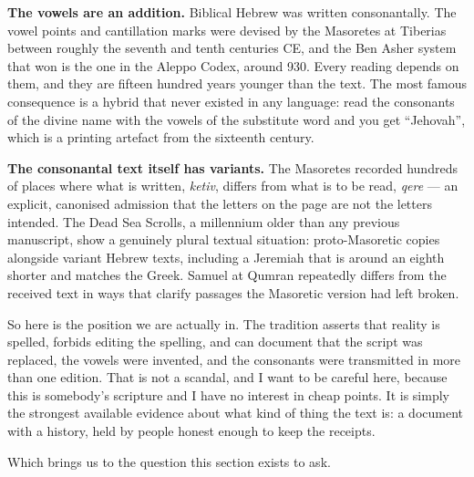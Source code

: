\textbf{The vowels are an addition.} Biblical Hebrew was written consonantally. The vowel points
and cantillation marks were devised by the Masoretes at Tiberias between roughly the seventh and
tenth centuries CE, and the Ben Asher system that won is the one in the Aleppo Codex, around 930.
Every reading depends on them, and they are fifteen hundred years younger than the text. The most
famous consequence is a hybrid that never existed in any language: read the consonants of the
divine name with the vowels of the substitute word and you get ``Jehovah'', which is a printing
artefact from the sixteenth century.

\textbf{The consonantal text itself has variants.} The Masoretes recorded hundreds of places where
what is written, \emph{ketiv}, differs from what is to be read, \emph{qere} --- an explicit,
canonised admission that the letters on the page are not the letters intended. The Dead Sea
Scrolls, a millennium older than any previous manuscript, show a genuinely plural textual
situation: proto-Masoretic copies alongside variant Hebrew texts, including a Jeremiah that is
around an eighth shorter and matches the Greek. Samuel at Qumran repeatedly differs from the
received text in ways that clarify passages the Masoretic version had left broken.

So here is the position we are actually in. The tradition asserts that reality is spelled, forbids
editing the spelling, and can document that the script was replaced, the vowels were invented, and
the consonants were transmitted in more than one edition.  That is not a scandal, and I want to be careful here, because this is
somebody's scripture and I have no interest in cheap points. It is simply the strongest available
evidence about what kind of thing the text is: a document with a history, held by people honest
enough to keep the receipts.

Which brings us to the question this section exists to ask.


